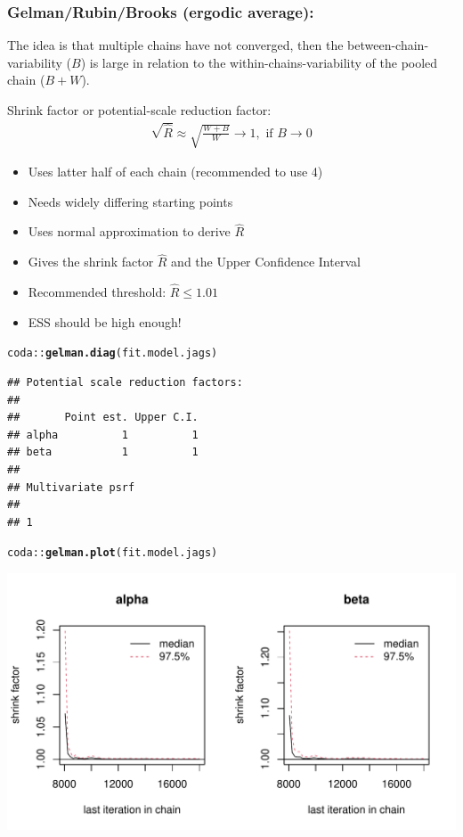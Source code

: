 \documentclass{article}\usepackage[]{graphicx}\usepackage[]{xcolor}
\makeatletter
\def\maxwidth{ %
  \ifdim\Gin@nat@width>\linewidth
    \linewidth
  \else
    \Gin@nat@width
  \fi
}
\newcommand{\hlopt}[1]{\textcolor[rgb]{0,0,0}{#1}}%
\newcommand{\hlstd}[1]{\textcolor[rgb]{0.345,0.345,0.345}{#1}}%
\newcommand{\hlkwd}[1]{\textcolor[rgb]{0.737,0.353,0.396}{\textbf{#1}}}%
\newenvironment{kframe}{%
 \def\at@end@of@kframe{}%
 \ifinner\ifhmode%
  \def\at@end@of@kframe{\end{minipage}}%
  \begin{minipage}{\columnwidth}%
 \fi\fi%
 \def\FrameCommand##1{\hskip\@totalleftmargin \hskip-\fboxsep
 \colorbox{shadecolor}{##1}\hskip-\fboxsep
     \hskip-\linewidth \hskip-\@totalleftmargin \hskip\columnwidth}%
 \MakeFramed {\advance\hsize-\width
   \@totalleftmargin\z@ \linewidth\hsize
   \@setminipage}}%
 {\par\unskip\endMakeFramed%
 \at@end@of@kframe}
\newenvironment{knitrout}{}{} %
\makeatother
\begin{document}
\begin{multicols*}{2}

\subsubsection{Gelman/Rubin/Brooks (ergodic average):}

The idea is that multiple chains have not converged, then the between-chain-variability ($B$) is large in relation to the within-chains-variability of the pooled chain ($B+W$). 

Shrink factor or potential-scale reduction factor:
\begin{align*}
\sqrt{\hat{R}}\approx\sqrt{\frac{W+B}{W}}\rightarrow 1,\text{  if  }B\rightarrow 0
\end{align*}

\begin{itemize}
\item Uses latter half of each chain (recommended to use 4)
\item Needs widely differing starting points
\item Uses normal approximation to derive $\hat{R}$ 
\item Gives the shrink factor $\hat{R}$ and the Upper Confidence Interval
\item Recommended threshold: $\hat{R}\leq 1.01$
\item ESS should be high enough!
\end{itemize}
\tiny
\begin{knitrout}
\color{fgcolor}\begin{kframe}
\begin{alltt}
\hlstd{coda}\hlopt{::}\hlkwd{gelman.diag}\hlstd{(fit.model.jags)}
\end{alltt}
\begin{verbatim}
## Potential scale reduction factors:
## 
##       Point est. Upper C.I.
## alpha          1          1
## beta           1          1
## 
## Multivariate psrf
## 
## 1
\end{verbatim}
\begin{alltt}
\hlstd{coda}\hlopt{::}\hlkwd{gelman.plot}\hlstd{(fit.model.jags)}
\end{alltt}
\end{kframe}
\includegraphics[width=\maxwidth]{figure/gelman-1} 

\end{knitrout}
\end{multicols*}
\end{document}
